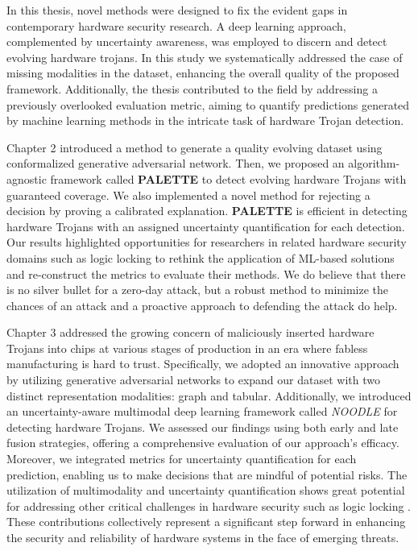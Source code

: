 \begingroup
\RaggedRight

In this thesis, novel methods were designed to fix the evident gaps in contemporary hardware security research. A deep learning approach, complemented by uncertainty awareness, was employed to discern and detect evolving hardware trojans. In this study we systematically addressed the case of missing modalities in the dataset, enhancing the overall quality of the proposed framework. Additionally, the thesis contributed to the field by addressing a previously overlooked evaluation metric, aiming to quantify predictions generated by machine learning methods in the intricate task of hardware Trojan detection.

Chapter 2 introduced a method to generate a quality evolving dataset using conformalized generative adversarial network. Then, we proposed an algorithm-agnostic framework called \textbf{PALETTE} to detect evolving hardware Trojans with guaranteed coverage. We also implemented a novel method for rejecting a decision by proving a calibrated explanation. \textbf{PALETTE} is efficient in detecting hardware Trojans with an assigned uncertainty quantification for each detection. Our results highlighted opportunities for researchers in related hardware security domains such as logic locking \cite{Rezaei:BreakUnroll, Rezaei:PUF, Maynard:DK-Lock, Aghamohammadi:CoLA} to rethink the application of ML-based solutions and re-construct the metrics to evaluate their methods. We do believe that there is no silver bullet for a zero-day attack, but a robust method to minimize the chances of an attack and a proactive approach to defending the attack do help.

Chapter 3 addressed the growing concern of maliciously inserted hardware Trojans into chips at various stages of production in an era where fabless manufacturing is hard to trust. Specifically, we adopted an innovative approach by utilizing generative adversarial networks to expand our dataset with two distinct representation modalities: graph and tabular. Additionally, we introduced an uncertainty-aware multimodal deep learning framework called \textit{NOODLE} for detecting hardware Trojans. We assessed our findings using both early and late fusion strategies, offering a comprehensive evaluation of our approach's efficacy. Moreover, we integrated metrics for uncertainty quantification for each prediction, enabling us to make decisions that are mindful of potential risks. The utilization of multimodality and uncertainty quantification shows great potential for addressing other critical challenges in hardware security such as logic locking \cite{Rezaei:BreakUnroll, Rezaei:PUF, Maynard:DK-Lock, Aghamohammadi:CoLA}. These contributions collectively represent a significant step forward in enhancing the security and reliability of hardware systems in the face of emerging threats.


